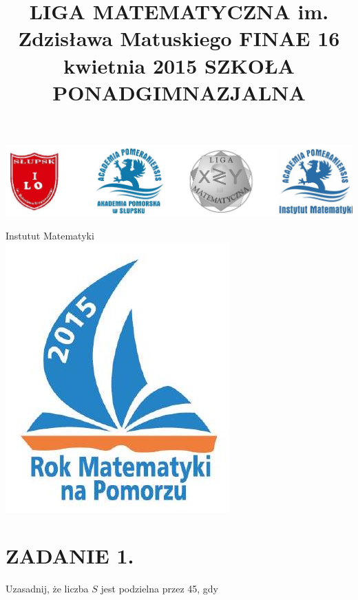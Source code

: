 \documentclass[10pt]{article}
\title{LIGA MATEMATYCZNA im. Zdzisława Matuskiego FINAE 16 kwietnia 2015 SZKOŁA PONADGIMNAZJALNA }
\author{}
\date{}
\begin{document}
\maketitle
\begin{center}
\includegraphics[max width=\textwidth]{2024_11_21_354cffe6d82f5e737a98g-1(1)}
\end{center}

Instutut Matematyki\\
\includegraphics[max width=\textwidth, center]{2024_11_21_354cffe6d82f5e737a98g-1}

\section*{ZADANIE 1.}
Uzasadnij, że liczba \(S\) jest podzielna przez 45, gdy
\end{document}
